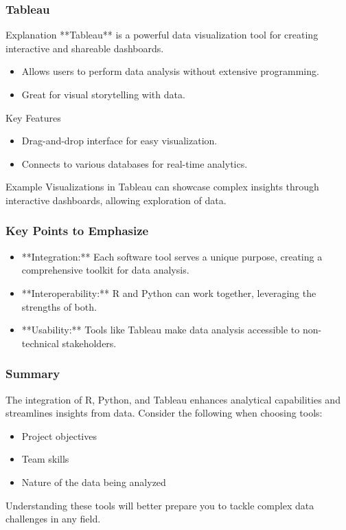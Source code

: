 \documentclass[aspectratio=169]{beamer}
\begin{document}
\begin{frame}
    \frametitle{Tableau}
    
    \begin{block}{Explanation}
        **Tableau** is a powerful data visualization tool for creating interactive and shareable dashboards.
        \begin{itemize}
            \item Allows users to perform data analysis without extensive programming.
            \item Great for visual storytelling with data.
        \end{itemize}
    \end{block}
    
    \begin{block}{Key Features}
        \begin{itemize}
            \item Drag-and-drop interface for easy visualization.
            \item Connects to various databases for real-time analytics.
        \end{itemize}
    \end{block}
    
    \begin{block}{Example}
        Visualizations in Tableau can showcase complex insights through interactive dashboards, allowing exploration of data.
    \end{block}
\end{frame}

\begin{frame}
    \frametitle{Key Points to Emphasize}
    \begin{itemize}
        \item **Integration:** Each software tool serves a unique purpose, creating a comprehensive toolkit for data analysis.
        \item **Interoperability:** R and Python can work together, leveraging the strengths of both.
        \item **Usability:** Tools like Tableau make data analysis accessible to non-technical stakeholders.
    \end{itemize}
\end{frame}

\begin{frame}
    \frametitle{Summary}
    The integration of R, Python, and Tableau enhances analytical capabilities and streamlines insights from data.
    Consider the following when choosing tools:
    \begin{itemize}
        \item Project objectives
        \item Team skills
        \item Nature of the data being analyzed
    \end{itemize}
    Understanding these tools will better prepare you to tackle complex data challenges in any field.
\end{frame}
\end{document}
